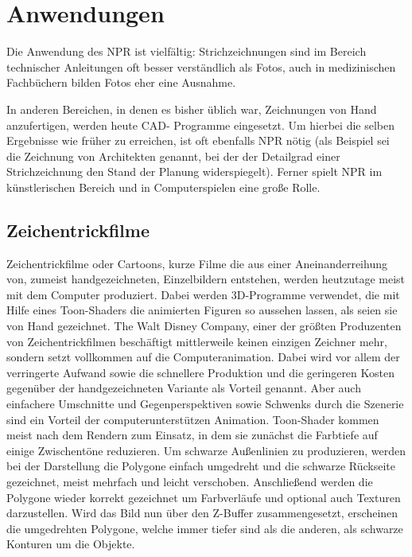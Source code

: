 \section{Anwendungen}
Die Anwendung des NPR ist vielfältig: Strichzeichnungen sind im Bereich 
technischer Anleitungen oft besser verständlich als Fotos, auch in 
medizinischen Fachbüchern bilden Fotos eher eine Ausnahme. \par In anderen 
Bereichen, in denen es bisher üblich war, Zeichnungen von Hand anzufertigen, 
werden heute CAD- Programme eingesetzt. Um hierbei die selben Ergebnisse wie 
früher zu erreichen, ist oft ebenfalls NPR nötig (als Beispiel sei die 
Zeichnung von Architekten genannt, bei der der Detailgrad einer Strichzeichnung 
den Stand der Planung widerspiegelt). Ferner spielt NPR im künstlerischen 
Bereich und in Computerspielen eine große Rolle.

\subsection{Zeichentrickfilme}
Zeichentrickfilme oder Cartoons, kurze Filme die aus einer Aneinanderreihung 
von, zumeist handgezeichneten, Einzelbildern entstehen, werden heutzutage meist 
mit dem Computer produziert. Dabei werden 3D-Programme verwendet, die mit Hilfe 
eines Toon-Shaders die animierten Figuren so aussehen lassen, als seien sie von 
Hand gezeichnet. The Walt Disney Company, einer der größten Produzenten von 
Zeichentrickfilmen beschäftigt mittlerweile keinen einzigen Zeichner mehr, 
sondern setzt vollkommen auf die Computeranimation. Dabei wird vor allem der 
verringerte Aufwand sowie die schnellere Produktion und die geringeren Kosten 
gegenüber der handgezeichneten Variante als Vorteil genannt. Aber auch 
einfachere Umschnitte und Gegenperspektiven sowie Schwenks durch die Szenerie 
sind ein Vorteil der computerunterstützen Animation. Toon-Shader kommen meist 
nach dem Rendern zum Einsatz, in dem sie zunächst die Farbtiefe auf einige 
Zwischentöne reduzieren. Um schwarze Außenlinien zu produzieren, werden bei 
der Darstellung die Polygone einfach umgedreht und die schwarze Rückseite 
gezeichnet, meist mehrfach und leicht verschoben. Anschließend werden die 
Polygone wieder korrekt gezeichnet um Farbverläufe und optional auch Texturen 
darzustellen. Wird das Bild nun über den Z-Buffer zusammengesetzt, erscheinen 
die umgedrehten Polygone, welche immer tiefer sind als die anderen, als 
schwarze Konturen um die Objekte.

